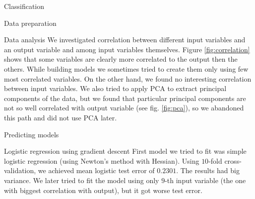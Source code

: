 \documentclass{article}
\begin{document}
\begin{section}{Classification}
\begin{subsection}{Data preparation}
\end{subsection}
\begin{subsection}{Data analysis}
We investigated correlation between different input variables and an output variable and among input variables themselves. Figure \ref{fig:correlation} shows that some variables are clearly more correlated to the output then the others. While building models we sometimes tried to create them only using few most correlated variables. On the other hand, we found no interesting correlation between input variables. We also tried to apply PCA to extract principal components of the data, but we found that particular principal components are not so well correlated with output variable (see fig. \ref{fig:pca}), so we abandoned this path and did not use PCA later.
\begin{figure}[!t]
\center
{}
\hfill
{}
\caption{}
\end{figure}

\end{subsection}
\begin{subsection}{Predicting models}
\begin{subsubsection}{Logistic regression using gradient descent}
First model we tried to fit was simple logistic regression (using Newton's method with Hessian). Using $10$-fold cross-validation, we achieved mean logistic test error of $0.2301$. The results had big variance. We later tried to fit the model using only $9$-th input variable (the one with biggest correlation with output), but it got worse test error.


\end{subsubsection}
\end{subsection}
\end{section}
\end{document}

